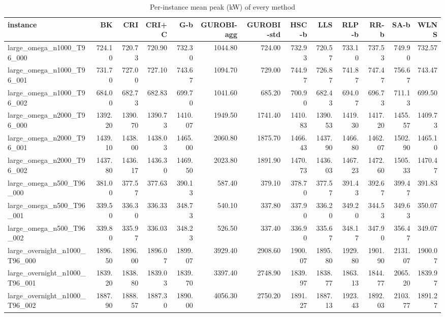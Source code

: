 \begin{table}[htbp]
\centering
\small
\caption{Per-instance mean peak (kW) of every method}
\label{tab:E4a_equal_budgets_b1_per_instance}
\begin{tabular}{lrrrrrrrrrrrr}
\toprule
instance & BK & CRI & CRI+C & G-b & GUROBI-agg & GUROBI-std & HSC-b & LLS & RLP-b & RR-b & SA-b & WLNS \\
\midrule
large\_omega\_n1000\_T96\_000 & 724.10 & 720.73 & 720.90 & 732.30 & 1044.80 & 724.00 & 732.93 & 720.57 & 733.10 & 737.53 & 749.90 & 732.57 \\
large\_omega\_n1000\_T96\_001 & 731.70 & 727.00 & 727.10 & 743.67 & 1094.70 & 729.00 & 744.97 & 726.87 & 741.87 & 747.47 & 756.67 & 743.47 \\
large\_omega\_n1000\_T96\_002 & 684.00 & 682.73 & 682.83 & 699.70 & 1041.60 & 685.20 & 700.90 & 682.43 & 694.07 & 696.73 & 711.13 & 699.50 \\
large\_omega\_n2000\_T96\_000 & 1392.20 & 1390.70 & 1390.73 & 1410.07 & 1949.50 & 1741.40 & 1410.83 & 1390.53 & 1419.30 & 1417.20 & 1455.57 & 1409.73 \\
large\_omega\_n2000\_T96\_001 & 1439.10 & 1438.00 & 1438.03 & 1465.00 & 2060.80 & 1875.70 & 1466.43 & 1437.90 & 1466.80 & 1462.07 & 1502.90 & 1465.10 \\
large\_omega\_n2000\_T96\_002 & 1437.80 & 1436.17 & 1436.30 & 1469.50 & 2023.80 & 1891.90 & 1470.73 & 1436.03 & 1467.23 & 1472.60 & 1505.33 & 1470.47 \\
large\_omega\_n500\_T96\_000 & 381.00 & 377.57 & 377.63 & 390.13 & 587.40 & 379.10 & 378.70 & 377.57 & 391.43 & 392.67 & 399.47 & 391.83 \\
large\_omega\_n500\_T96\_001 & 339.50 & 336.30 & 336.33 & 348.73 & 540.10 & 337.80 & 337.90 & 336.20 & 349.20 & 344.53 & 349.63 & 350.07 \\
large\_omega\_n500\_T96\_002 & 339.80 & 335.97 & 336.03 & 348.23 & 526.50 & 337.40 & 336.90 & 335.67 & 348.17 & 347.90 & 356.47 & 349.07 \\
large\_overnight\_n1000\_T96\_000 & 1896.50 & 1896.00 & 1896.07 & 1899.07 & 3929.40 & 2908.60 & 1900.07 & 1895.80 & 1929.80 & 1901.90 & 2131.07 & 1900.07 \\
large\_overnight\_n1000\_T96\_001 & 1839.20 & 1838.80 & 1839.03 & 1839.70 & 3397.40 & 2748.90 & 1839.97 & 1838.77 & 1863.13 & 1844.77 & 2065.20 & 1839.97 \\
large\_overnight\_n1000\_T96\_002 & 1887.90 & 1888.57 & 1887.30 & 1890.00 & 4056.30 & 2750.20 & 1891.27 & 1887.13 & 1923.43 & 1892.03 & 2103.77 & 1891.27 \\

\end{tabular}
\end{table}
